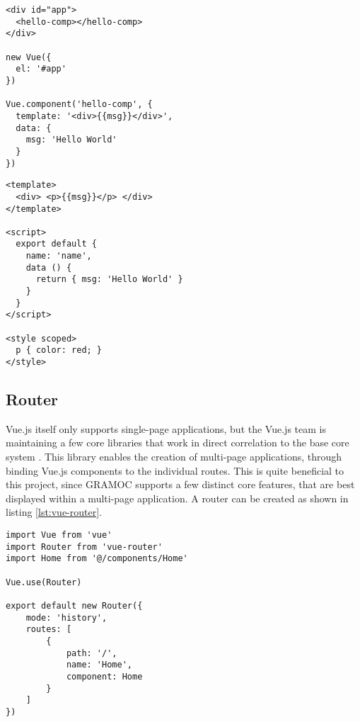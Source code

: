 \noindent\begin{minipage}{.45\textwidth}
\begin{lstlisting}[caption={Creating a Vue instance and adding a component to it}, label=lst:vue-component, captionpos=b, style=htmlcssjs]
<div id="app">
  <hello-comp></hello-comp>
</div>

new Vue({
  el: '#app'
})

Vue.component('hello-comp', {
  template: '<div>{{msg}}</div>',
  data: {
    msg: 'Hello World'
  }
})
\end{lstlisting}
\end{minipage}\hfill
\begin{minipage}{.45\textwidth}
\begin{lstlisting}[caption={Example for a simple single file component}, label=lst:vue-sf-component, captionpos=b, style=htmlcssjs]
<template>
  <div> <p>{{msg}}</p> </div>
</template>

<script>
  export default {
    name: 'name',
    data () {
      return { msg: 'Hello World' }
    }
  }
</script>

<style scoped>
  p { color: red; }
</style>
\end{lstlisting}
\end{minipage}

\subsection{Router}
Vue.js itself only supports single-page applications, but the Vue.js team is maintaining a few core libraries that work in direct correlation to the base core system \autocite{vuerouter}. This library enables the creation of multi-page applications, through binding Vue.js components to the individual routes. This is quite beneficial to this project, since GRAMOC supports a few distinct core features, that are best displayed within a multi-page application. A router can be created as shown in listing \vref{lst:vue-router}.

\begin{minipage}{\linewidth}
\begin{lstlisting}[caption={Creating a router instance with one \textit{Home} route}, label=lst:vue-router, captionpos=b, style=htmlcssjs]
import Vue from 'vue'
import Router from 'vue-router'
import Home from '@/components/Home'

Vue.use(Router)

export default new Router({
    mode: 'history',
    routes: [
        {
            path: '/',
            name: 'Home',
            component: Home
        }
    ]
})
\end{lstlisting}
\end{minipage}

